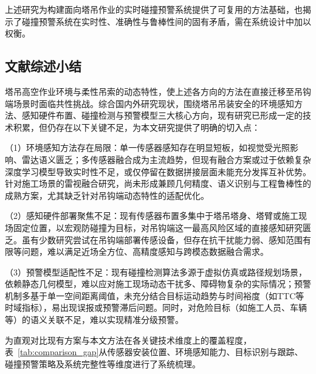 上述研究为构建面向塔吊作业的实时碰撞预警系统提供了可复用的方法基础，也揭示了碰撞预警系统在实时性、准确性与鲁棒性间的固有矛盾，需在系统设计中加以权衡。

\subsection{文献综述小结}\label{ux6587ux732eux603bux7ed3}

塔吊高空作业环境与柔性吊索的动态特性，使上述各方向的方法在直接迁移至吊钩端场景时面临共性挑战。综合国内外研究现状，围绕塔吊吊装安全的环境感知方法、感知硬件布置、碰撞检测与预警模型三大核心方向，现有研究已形成一定的技术积累，但仍存在以下关键不足，为本文研究提供了明确的切入点：

（1）环境感知方法存在局限：单一传感器感知存在明显短板，如视觉受光照影响、雷达语义匮乏；多传感器融合成为主流趋势，但现有融合方案或过于依赖复杂深度学习模型导致实时性不足，或仅停留在数据拼接层面未能充分发挥互补优势。针对施工场景的雷视融合研究，尚未形成兼顾几何精度、语义识别与工程鲁棒性的成熟方案，尤其缺乏针对吊钩端动态特性的适配优化。

（2）感知硬件部署聚焦不足：现有传感器布置多集中于塔吊塔身、塔臂或施工现场固定位置，以宏观防碰撞为目标，对吊钩端这一最高风险区域的直接感知研究匮乏。虽有少数研究尝试在吊钩端部署传感设备，但存在抗干扰能力弱、感知范围有限等问题，难以满足近场全方位、高精度感知与跨模态数据融合需求。

（3）预警模型适配性不足：现有碰撞检测算法多源于虚拟仿真或路径规划场景，依赖静态几何模型，难以应对施工现场动态干扰多、障碍物复杂的实际情况；预警机制多基于单一空间距离阈值，未充分结合目标运动趋势与时间裕度（如TTC等时域指标），易出现误报或预警滞后问题。同时，对危险目标（如施工人员、车辆等）的语义关联不足，难以实现精准分级预警。

为直观对比现有方案与本文方法在各关键技术维度上的覆盖程度，表~\ref{tab:comparison_gap}从传感器安装位置、环境感知能力、目标识别与跟踪、碰撞预警策略及系统完整性等维度进行了系统梳理。

